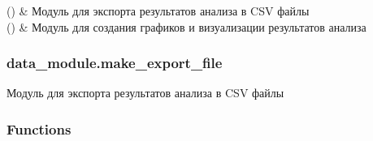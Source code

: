 \documentclass[a4paper,11pt,russian,openany,oneside]{sphinxmanual}
\begin{document}
\begin{savenotes}\sphinxattablestart
\sphinxthistablewithglobalstyle
\sphinxthistablewithnovlinesstyle
\centering
\begin{tabulary}{\linewidth}[t]{}
\sphinxtoprule
\sphinxtableatstartofbodyhook
\sphinxAtStartPar
{\hyperref[\detokenize{data_module:module-data_module.make_export_file}]{}} ()
&
\sphinxAtStartPar
Модуль для экспорта результатов анализа в CSV файлы
\\
\sphinxhline
\sphinxAtStartPar
{\hyperref[\detokenize{data_module:module-data_module.make_export_plot}]{}} ()
&
\sphinxAtStartPar
Модуль для создания графиков и визуализации результатов анализа
\\
\sphinxbottomrule
\end{tabulary}
\sphinxtableafterendhook\par
\sphinxattableend\end{savenotes}

\sphinxstepscope


\subsubsection{data\_module.make\_export\_file}
\label{\detokenize{_autosummary/data_module.make_export_file:module-data_module.make_export_file}}\label{\detokenize{_autosummary/data_module.make_export_file:data-module-make-export-file}}\label{\detokenize{_autosummary/data_module.make_export_file::doc}}
\sphinxAtStartPar
Модуль для экспорта результатов анализа в CSV файлы
\subsubsection*{Functions}
\end{document}
